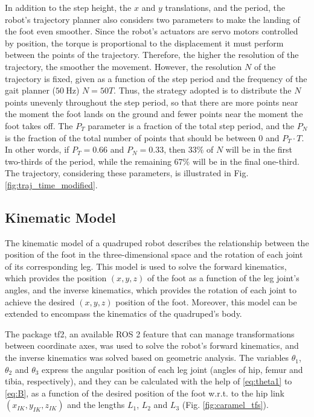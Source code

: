 \documentclass[conference]{IEEEtran}
\begin{document}
In addition to the step height, the $x$ and $y$ translations, and the period, the robot's trajectory planner also considers two parameters to make the landing of the foot even smoother. Since the robot’s actuators are servo motors controlled by position, the torque is proportional to the displacement it must perform between the points of the trajectory. Therefore, the higher the resolution of the trajectory, the smoother the movement. However, the resolution $N$ of the trajectory is fixed, given as a function of the step period and the frequency of the gait planner ($\SI{50}{\hertz}$) $N = 50T$. Thus, the strategy adopted is to distribute the $N$ points unevenly throughout the step period, so that there are more points near the moment the foot lands on the ground and fewer points near the moment the foot takes off. The $P_T$ parameter is a fraction of the total step period, and the $P_N$ is the fraction of the total number of points that should be between $0$ and $P_T \cdot T$. In other words, if $P_T = 0.66$ and $P_N = 0.33$, then 33\% of $N$ will be in the first two-thirds of the period, while the remaining $67\%$ will be in the final one-third. The trajectory, considering these parameters, is illustrated in Fig. \ref{fig:traj_time_modified}.

\subsection{Kinematic Model}
\label{sec:detail_inv_kinematics}

The kinematic model of a quadruped robot describes the relationship between the position of the foot in the three-dimensional space and the rotation of each joint of its corresponding leg. This model is used to solve the forward kinematics, which provides the position $(x, y, z)$ of the foot as a function of the leg joint's angles, and the inverse kinematics, which provides the rotation of each joint to achieve the desired $(x, y, z)$ position of the foot. Moreover, this model can be extended to encompass the kinematics of the quadruped's body.

The package tf2, an available ROS 2 feature that can manage transformations between coordinate axes, was used to solve the robot's forward kinematics, and the inverse kinematics was solved based on geometric analysis. The variables $\theta_1$, $\theta_2$ and $\theta_3$ express the angular position of each leg joint (angles of hip, femur and tibia, respectively), and they can be calculated with the help of \eqref{eq:theta1} to \eqref{eq:B}, as a function of the desired position of the foot w.r.t. to the hip link $(x_{IK}, y_{IK}, z_{IK})$ and the lengths $L_1$, $L_2$ and $L_3$ (Fig. \ref{fig:caramel_tfs}).
\end{document}
